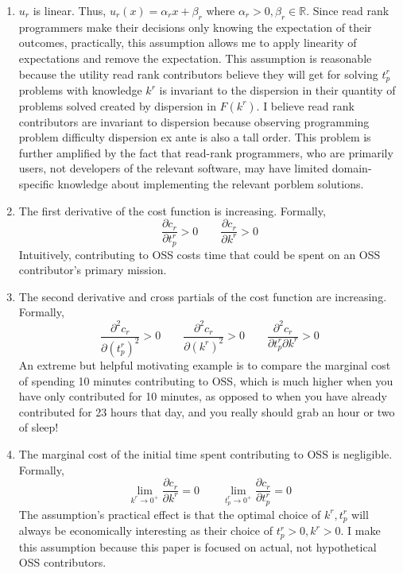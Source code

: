 \documentclass[source/paper/main.tex]{subfiles}
\begin{document}
\begin{enumerate}
    \item $u_r$ is linear. Thus, $u_r(x) = \alpha_r x + \beta_r$ where $\alpha_r > 0, \beta_r \in \mathbb{R}$. Since read rank programmers make their decisions only knowing the expectation of their outcomes, practically, this assumption allows me to apply linearity of expectations and remove the expectation. This assumption is reasonable because the utility read rank contributors believe they will get for solving $t_p^r$ problems with knowledge $k^r$ is invariant to the dispersion in their quantity of problems solved created by dispersion in $F(k^r)$. I believe read rank contributors are invariant to dispersion because observing programming problem difficulty dispersion ex ante is also a tall order. This problem is further amplified by the fact that read-rank programmers, who are primarily users, not developers of the relevant software, may have limited domain-specific knowledge about implementing the relevant porblem solutions.  
    
    \item The first derivative of the cost function is increasing. Formally, 
    $$\frac{\partial c_r}{\partial t_p^r}>0 \qquad \frac{\partial c_r}{\partial k^r}>0$$
    Intuitively, contributing to OSS costs time that could be spent on an OSS contributor's primary mission. 
    \item The second derivative and cross partials of the cost function are increasing. Formally, $$\frac{\partial^2 c_r}{\partial (t_p^r)^2}>0 \qquad \frac{\partial^2 c_r}{\partial (k^r)^2}>0 \qquad \frac{\partial^2 c_r}{\partial t_p^r \partial k^r}>0$$
    An extreme but helpful motivating example is to compare the marginal cost of spending 10 minutes contributing to OSS, which is much higher when you have only contributed for 10 minutes, as opposed to when you have already contributed for 23 hours that day, and you really should grab an hour or two of sleep! 
    \item The marginal cost of the initial time spent contributing to OSS is negligible. Formally, $$\lim_{k^r \to 0^+} \frac{\partial c_r}{\partial k^r} = 0 \qquad  \lim_{t_p^r \to 0^+} \frac{\partial c_r}{\partial t_p^r} = 0$$
    The assumption's practical effect is that the optimal choice of $k^r, t_p^r$ will always be economically interesting as their choice of $t_p^r>0, k^r>0$. I make this assumption because this paper is focused on actual, not hypothetical OSS contributors.
\end{enumerate}
\end{document}
